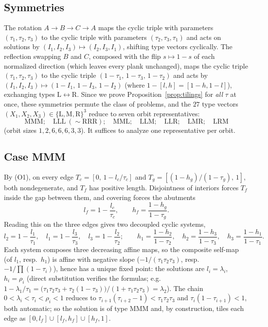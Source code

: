 \documentclass[11pt,reqno]{amsart}
\theoremstyle{plain}
\theoremstyle{definition}
\theoremstyle{remark}
\begin{document}
\subsection*{Symmetries}
The rotation $A\to B\to C\to A$ maps the cyclic triple with parameters
$(\tau_1,\tau_2,\tau_3)$ to the cyclic triple with parameters
$(\tau_2,\tau_3,\tau_1)$ and acts on solutions by
$(I_1,I_2,I_3)\mapsto(I_2,I_3,I_1)$, shifting type vectors cyclically. The
reflection swapping $B$ and $C$, composed with the flip $s\mapsto1-s$ of each
normalized direction (which leaves every plank unchanged), maps the cyclic
triple $(\tau_1,\tau_2,\tau_3)$ to the cyclic triple
$(1-\tau_1,\,1-\tau_3,\,1-\tau_2)$ and acts by
$(I_1,I_2,I_3)\mapsto(1-I_1,\,1-I_3,\,1-I_2)$ (where $1-[l,h]=[1-h,1-l]$),
exchanging types $\mathrm L\leftrightarrow\mathrm R$. Since we prove
Proposition~\ref{prop:tilings} for \emph{all} $\tau$ at once, these symmetries
permute the class of problems, and the $27$ type vectors
$(X_1,X_2,X_3)\in\{\mathrm L,\mathrm M,\mathrm R\}^3$ reduce to seven orbit
representatives:
\[
\mathrm{MMM};\quad \mathrm{LLL}\ (\sim\mathrm{RRR});\quad \mathrm{MML};\quad
\mathrm{LLM};\quad \mathrm{LLR};\quad \mathrm{LMR};\quad \mathrm{LRM}
\]
(orbit sizes $1,2,6,6,6,3,3$). It suffices to analyze one representative per
orbit.

\subsection*{Case MMM}
By (O1), on every edge $T_c=[0,\,1-l_c/\tau_c]$ and
$T_g=[(1-h_g)/(1-\tau_g),\,1]$, both nondegenerate, and $T_f$ has positive
length. Disjointness of interiors forces $T_f$ inside the gap between them, and
covering forces the abutments
\[
l_f=1-\frac{l_c}{\tau_c},\qquad h_f=\frac{1-h_g}{1-\tau_g}.
\]
Reading this on the three edges gives two decoupled cyclic systems,
\[
l_2=1-\frac{l_1}{\tau_1},\quad l_1=1-\frac{l_3}{\tau_3},\quad
l_3=1-\frac{l_2}{\tau_2};
\qquad
h_1=\frac{1-h_2}{1-\tau_2},\quad h_2=\frac{1-h_3}{1-\tau_3},\quad
h_3=\frac{1-h_1}{1-\tau_1}.
\]
Each system composes three decreasing affine maps, so the composite self-map
(of $l_1$, resp.\ $h_1$) is affine with negative slope
($-1/(\tau_1\tau_2\tau_3)$, resp.\ $-1/\prod(1-\tau_i)$), hence has a unique
fixed point: the solutions are $l_i=\lambda_i$, $h_i=\rho_i$ (direct
substitution verifies the formulas; e.g.\
$1-\lambda_1/\tau_1
=\bigl(\tau_1\tau_2\tau_3+\tau_2(1-\tau_3)\bigr)/(1+\tau_1\tau_2\tau_3)
=\lambda_2$). The chain
$0<\lambda_i<\tau_i<\rho_i<1$ reduces to
$\tau_{i+1}(\tau_{i+2}-1)<\tau_1\tau_2\tau_3$ and $\tau_i(1-\tau_{i+1})<1$,
both automatic; so the solution is of type MMM and, by construction, tiles each
edge as $[0,l_f]\cup[l_f,h_f]\cup[h_f,1]$.
\end{document}
